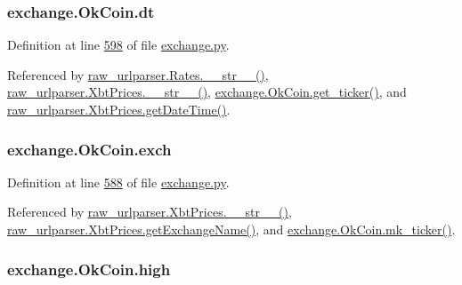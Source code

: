 \subsubsection[{\texorpdfstring{dt}{dt}}]{\setlength{\rightskip}{0pt plus 5cm}exchange.\+Ok\+Coin.\+dt}\hypertarget{classexchange_1_1_ok_coin_ade9d7cddcfa54f2b1ba5452854bfd48b}{}\label{classexchange_1_1_ok_coin_ade9d7cddcfa54f2b1ba5452854bfd48b}


Definition at line \hyperlink{exchange_8py_source_l00598}{598} of file \hyperlink{exchange_8py_source}{exchange.\+py}.



Referenced by \hyperlink{raw__urlparser_8py_source_l00038}{raw\+\_\+urlparser.\+Rates.\+\_\+\+\_\+str\+\_\+\+\_\+()}, \hyperlink{raw__urlparser_8py_source_l00074}{raw\+\_\+urlparser.\+Xbt\+Prices.\+\_\+\+\_\+str\+\_\+\+\_\+()}, \hyperlink{exchange_8py_source_l00600}{exchange.\+Ok\+Coin.\+get\+\_\+ticker()}, and \hyperlink{raw__urlparser_8py_source_l00059}{raw\+\_\+urlparser.\+Xbt\+Prices.\+get\+Date\+Time()}.

\subsubsection[{\texorpdfstring{exch}{exch}}]{\setlength{\rightskip}{0pt plus 5cm}exchange.\+Ok\+Coin.\+exch}\hypertarget{classexchange_1_1_ok_coin_a22678c192b53ddf34e8a636e0cdaf4d4}{}\label{classexchange_1_1_ok_coin_a22678c192b53ddf34e8a636e0cdaf4d4}


Definition at line \hyperlink{exchange_8py_source_l00588}{588} of file \hyperlink{exchange_8py_source}{exchange.\+py}.



Referenced by \hyperlink{raw__urlparser_8py_source_l00074}{raw\+\_\+urlparser.\+Xbt\+Prices.\+\_\+\+\_\+str\+\_\+\+\_\+()}, \hyperlink{raw__urlparser_8py_source_l00068}{raw\+\_\+urlparser.\+Xbt\+Prices.\+get\+Exchange\+Name()}, and \hyperlink{exchange_8py_source_l00614}{exchange.\+Ok\+Coin.\+mk\+\_\+ticker()}.

\subsubsection[{\texorpdfstring{high}{high}}]{\setlength{\rightskip}{0pt plus 5cm}exchange.\+Ok\+Coin.\+high}\hypertarget{classexchange_1_1_ok_coin_af9d9dbcfc86404510e7f9a5704e8eecd}{}\label{classexchange_1_1_ok_coin_af9d9dbcfc86404510e7f9a5704e8eecd}


